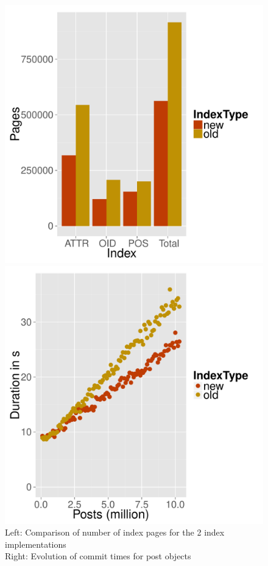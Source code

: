 \documentclass[11pt,a4paper,oneside]{article}
\begin{document}
\begin{figure}
    \begin{minipage}{0.45\textwidth}
    \centering
	\includegraphics[scale=0.37]{images/SO_sizes.pdf} 
	\end{minipage}
	\hspace{0.5cm}
	\begin{minipage}{0.45\textwidth}
	\centering
	\includegraphics[scale=0.37]{images/SO_commit_duration.pdf} 
	\end{minipage}
	
	\caption{Left: Comparison of number of index pages for the 2 index implementations \\
			Right: Evolution of commit times for post objects}
	\label{fig:so-sizes}
\end{figure}
\end{document}
